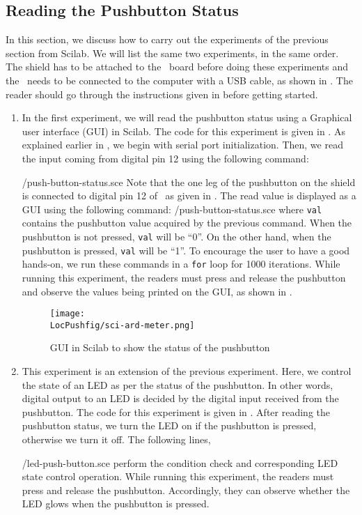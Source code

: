 \subsection{Reading the Pushbutton Status}
In this section, we discuss how to carry out the experiments of the
previous section from Scilab. We will list the same two experiments,
in the same order.  The shield has to be attached to the \arduino\ board
before doing these experiments and the \arduino\ needs to be connected to the computer 
with a USB cable, as shown in .
The reader should go through the instructions given in
 before getting started. 
\begin{enumerate}
\item In the first experiment, we will read the pushbutton status using a 
Graphical user interface (GUI) in Scilab. The code for this experiment is 
given in  . As explained earlier in , 
we begin with serial port initialization. Then, we read the input coming from
digital pin 12 using the following command: 
  
  {\LocPushscicode/push-button-status.sce} Note that the one leg of the pushbutton on
  the shield is connected to digital pin 12 of \arduino\, 
  as given in . The read value is displayed as a GUI using
  the following command: 
  {\LocPushscicode/push-button-status.sce} where {\tt val} contains
  the pushbutton value acquired by the previous command.
  When the pushbutton is not pressed, {\tt val} will be ``0''. On the other hand,
  when the pushbutton is pressed, {\tt val} will be ``1''. To
  encourage the user to have a good hands-on, we run these commands in
  a {\tt for} loop for 1000 iterations. While running this experiment, 
  the readers must press and release the pushbutton and observe the values being printed on the
  GUI, as shown in .
 \begin{figure}
    \centering
    \texttt{[image: \\LocPushfig/sci-ard-meter.png]}
    \caption{GUI in Scilab to show the status of the pushbutton}
    \label{fig:ard-meter}
  \end{figure}
\item This experiment is an extension of the previous
  experiment. Here, we control the state of an LED as per the status
  of the pushbutton. In other words, digital output to an LED is
  decided by the digital input received from the pushbutton. The code
  for this experiment is given in . After reading
  the pushbutton status, we turn the LED on if the pushbutton is
  pressed, otherwise we turn it off. The following lines,
  
  {\LocPushscicode/led-push-button.sce} perform the condition check
  and corresponding LED state control operation. While running this experiment, the readers 
  must press and release the pushbutton. Accordingly, they can observe whether 
  the LED glows when the pushbutton is pressed. 
\end{enumerate}

